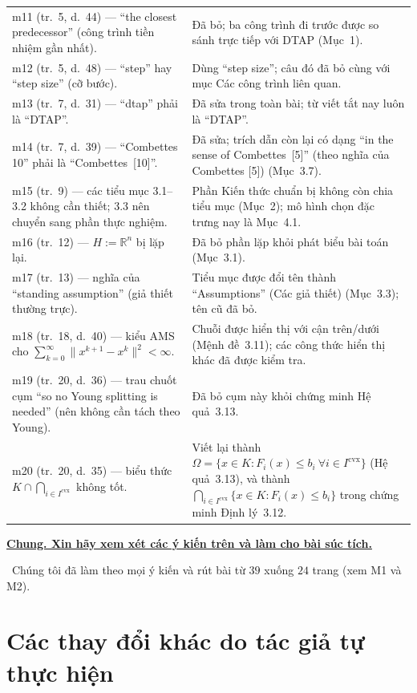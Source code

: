 \documentclass[11pt]{article}
\newcommand{\response}[1]{\smallskip\noindent{\color{blue!60!black}\textbf{Trả lời.}}\ #1\par\medskip}
\newenvironment{point}[1]{\medskip\noindent\textbf{\uline{#1}}\par}{\par}
\begin{document}
{\begin{longtable}{@{}>{\raggedright\arraybackslash}p{}
                    >{\raggedright\arraybackslash}p{}@{}}
m11 (tr.~5, d.~44) --- ``the closest predecessor'' (công trình tiền nhiệm gần nhất).
  & Đã bỏ; ba công trình đi trước được so sánh trực tiếp với DTAP (Mục~1).\\
m12 (tr.~5, d.~48) --- ``step'' hay ``step size'' (cỡ bước).
  & Dùng ``step size''; câu đó đã bỏ cùng với mục Các công trình liên quan.\\
m13 (tr.~7, d.~31) --- ``dtap'' phải là ``DTAP''.
  & Đã sửa trong toàn bài; từ viết tắt nay luôn là ``DTAP''.\\
m14 (tr.~7, d.~39) --- ``Combettes 10'' phải là ``Combettes~[10]''.
  & Đã sửa; trích dẫn còn lại có dạng ``in the sense of Combettes~[5]'' (theo nghĩa của Combettes [5]) (Mục~3.7).\\
m15 (tr.~9) --- các tiểu mục 3.1--3.2 không cần thiết; 3.3 nên chuyển sang phần thực nghiệm.
  & Phần Kiến thức chuẩn bị không còn chia tiểu mục (Mục~2); mô hình chọn đặc trưng nay là Mục~4.1.\\
m16 (tr.~12) --- $H:=\mathbb{R}^n$ bị lặp lại.
  & Đã bỏ phần lặp khỏi phát biểu bài toán (Mục~3.1).\\
m17 (tr.~13) --- nghĩa của ``standing assumption'' (giả thiết thường trực).
  & Tiểu mục được đổi tên thành ``Assumptions'' (Các giả thiết) (Mục~3.3); tên cũ đã bỏ.\\
m18 (tr.~18, d.~40) --- kiểu AMS cho $\sum_{k=0}^{\infty}\lVert x^{k+1}-x^k\rVert^2<\infty$.
  & Chuỗi được hiển thị với cận trên/dưới (Mệnh đề~3.11); các công thức hiển thị khác đã được kiểm tra.\\
m19 (tr.~20, d.~36) --- trau chuốt cụm ``so no Young splitting is needed'' (nên không cần tách theo Young).
  & Đã bỏ cụm này khỏi chứng minh Hệ quả~3.13.\\
m20 (tr.~20, d.~35) --- biểu thức $K\cap\bigcap_{i\in I^{\mathrm{cvx}}}$ không tốt.
  & Viết lại thành $\Omega=\{x\in K:F_i(x)\le b_i\ \forall i\in I^{\mathrm{cvx}}\}$ (Hệ quả~3.13), và thành $\bigcap_{i\in I^{\mathrm{cvx}}}\{x\in K:F_i(x)\le b_i\}$ trong chứng minh Định lý~3.12.\\
\end{longtable}}

\begin{point}{Chung. Xin hãy xem xét các ý kiến trên và làm cho bài súc tích.}
\response{Chúng tôi đã làm theo mọi ý kiến và rút bài từ $39$ xuống $24$ trang
(xem M1 và M2).}
\end{point}

\section*{Các thay đổi khác do tác giả tự thực hiện}
\end{document}
